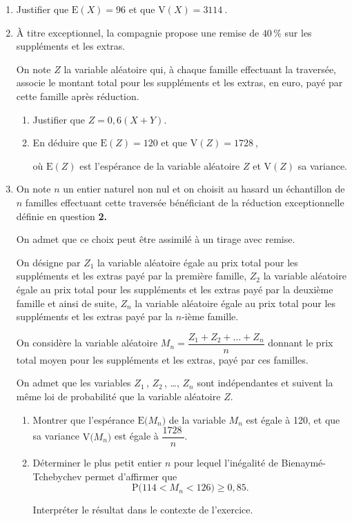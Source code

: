 \documentclass[10pt]{article}
\providecommand{\np}[2][]{{#2~#1}}
\begin{document}
	\begin{enumerate}
		\item Justifier que \quad $\mathrm{E}(X)=96$ \quad et que \quad $\mathrm{V}(X)=\np{3114}$.

		\item À titre exceptionnel, la compagnie propose une remise de $40\,\%$ sur les suppléments et les extras.

		On note $Z$ la variable aléatoire qui, à chaque famille effectuant la traversée, associe le montant total pour les suppléments et les extras, en euro, payé par cette famille après réduction.

		\begin{enumerate}
			\item Justifier que \quad $Z = 0,6(X + Y)$.
			\item En déduire que \quad $\mathrm{E}(Z)=120$ \quad et que \quad $\mathrm{V}(Z)=\np{1728}$,

			où $\mathrm{E}(Z)$ est l'espérance de la variable aléatoire $Z$ et $\mathrm{V}(Z)$ sa variance.
		\end{enumerate}

		\item On note $n$ un entier naturel non nul et on choisit au hasard un échantillon de $n$ familles effectuant cette traversée bénéficiant de la réduction exceptionnelle définie en question \textbf{2.}

		On admet que ce choix peut être assimilé à un tirage avec remise.

		On désigne par $Z_{1}$ la variable aléatoire égale au prix total pour les suppléments et les extras payé par la première famille, $Z_{2}$ la variable aléatoire égale au prix total pour les suppléments et les extras payé par la deuxième famille et ainsi de suite, $Z_{n}$ la variable aléatoire égale au prix total pour les suppléments et les extras payé par la $n$-ième famille.

		On considère la variable aléatoire \quad $M_{n}=\dfrac{Z_{1}+Z_{2}+\ldots+Z_{n}}{n}$ \quad donnant le prix total moyen pour les suppléments et les extras, payé par ces familles.

		On admet que les variables $Z_{1}$\,, $Z_{2}$\,, \ldots, $Z_{n}$ sont indépendantes et suivent la même loi de probabilité que la variable aléatoire $Z$.

		\begin{enumerate}
			\item Montrer que l'espérance $\mathrm{E}\big(M_{n}\big)$ de la variable $M_{n}$ est égale à 120, et que sa variance $\mathrm{V}\big(M_{n}\big)$ est égale à $\dfrac{\np{1728}}{n}$.

			\item Déterminer le plus petit entier $n$ pour lequel l'inégalité de Bienaymé-Tchebychev permet d'affirmer que \[\mathrm{P}\big(114<M_{n}<126\big) \geqslant 0,85.\]

			Interpréter le résultat dans le contexte de l'exercice.
		\end{enumerate}
	\end{enumerate}
\end{document}
